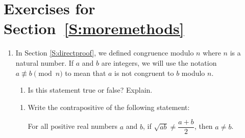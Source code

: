 \section*{Exercises for Section~\ref{S:moremethods}}
\begin{enumerate}


\xitem Let $n$ be an integer.  Prove each of the following:\label{exer:ncubed}%
  \begin{enumerate}
    \item If  $n$  is even, then  $n^3 $  is even.
    \item If  $n^3 $  is even, then  $n$  is even.
    \item The integer  $n$ is even if and only if  $n^3 $  is an even integer.
    \item The integer  $n$  is odd if and only if  $n^3 $  is an odd integer.
  \end{enumerate}
\item In Section \ref{S:directproof}, we defined congruence modulo  $n$   where  $n$  is a natural number.  If  $a$  and  $b$  are integers, we will use the notation  
$a \not\equiv b \pmod n$ to mean that  $a$  is not congruent to  $b$  modulo  $n$.
\label{exer:sec32-2}%
  \begin{enumerate}
    \yitem Write the contrapositive of the following conditional statement:

    
    \item Is this statement true or false?  Explain.
  \end{enumerate}
\xitem   \begin{enumerate}
    \item Write the contrapositive of the following statement:
      \begin{center}
       For all positive real numbers $a$ and $b$, if $\sqrt {ab}  \ne \dfrac{{a + b}}{2}$, then  $a \ne b$.
      \end{center}


\end{enumerate}
\end{enumerate}
